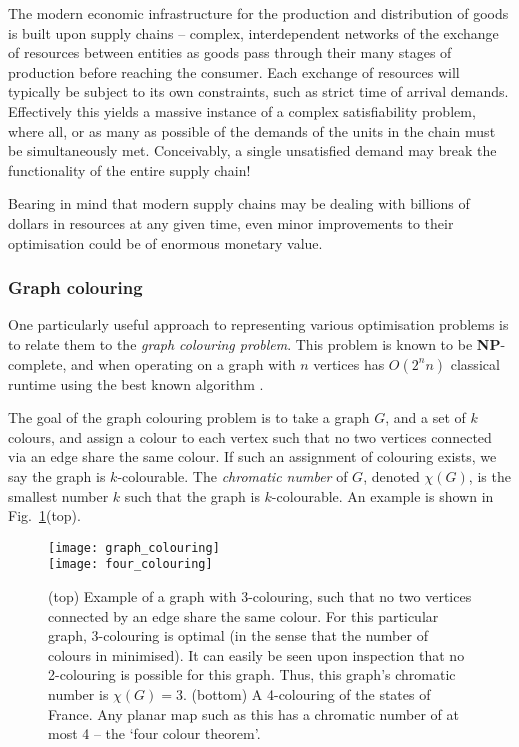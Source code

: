 The modern economic infrastructure for the production and distribution of goods is built upon supply chains -- complex, interdependent networks of the exchange of resources between entities as goods pass through their many stages of production before reaching the consumer. Each exchange of resources will typically be subject to its own constraints, such as strict time of arrival demands. Effectively this yields a massive instance of a complex satisfiability problem, where all, or as many as possible of the demands of the units in the chain must be simultaneously met. Conceivably, a single unsatisfied demand may break the functionality of the entire supply chain! 

Bearing in mind that modern supply chains may be dealing with billions of dollars in resources at any given time, even minor improvements to their optimisation could be of enormous monetary value.

\subsubsection{Graph colouring}

One particularly useful approach to representing various optimisation problems is to relate them to the \textit{graph colouring problem}. This problem is known to be \textbf{NP}-complete, and when operating on a graph with $n$ vertices has $O(2^nn)$ classical runtime using the best known algorithm \cite{???}.

The goal of the graph colouring problem is to take a graph $G$, and a set of $k$ colours, and assign a colour to each vertex such that no two vertices connected via an edge share the same colour. If such an assignment of colouring exists, we say the graph is $k$-colourable. The \textit{chromatic number} of $G$, denoted \mbox{$\chi(G)$}, is the smallest number $k$ such that the graph is $k$-colourable. An example is shown in Fig.~\ref{fig:graph_colouring}(top).

\begin{figure}[!htb]
\texttt{[image: graph\_colouring]}\\
\texttt{[image: four\_colouring]}
\caption{(top) Example of a graph with 3-colouring, such that no two vertices connected by an edge share the same colour. For this particular graph, 3-colouring is optimal (in the sense that the number of colours in minimised). It can easily be seen upon inspection that no 2-colouring is possible for this graph. Thus, this graph's chromatic number is \mbox{$\chi(G)=3$}. (bottom) A 4-colouring of the states of France. Any planar map such as this has a chromatic number of at most 4 -- the `four colour theorem'.}\label{fig:graph_colouring}	
\end{figure}

